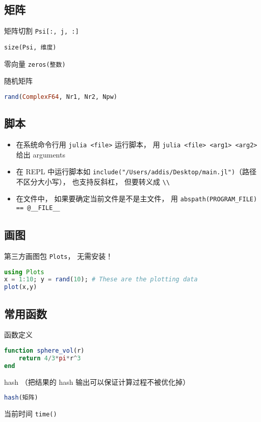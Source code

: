 \subsection{矩阵}
矩阵切割 \verb|Psi[:, j, :]|

\verb|size(Psi, 维度)|

零向量 \verb|zeros(整数)|

随机矩阵
\begin{lstlisting}[language=julia]
rand(ComplexF64, Nr1, Nr2, Npw)
\end{lstlisting}

\subsection{脚本}
\begin{itemize}
\item 在系统命令行用 \verb|julia <file>| 运行脚本， 用 \verb|julia <file> <arg1> <arg2>| 给出 arguments
\item 在 REPL 中运行脚本如 \verb|include("/Users/addis/Desktop/main.jl")|（路径不区分大小写）， 也支持反斜杠， 但要转义成 \verb|\\|
\item 在文件中， 如果要确定当前文件是不是主文件， 用 \verb|abspath(PROGRAM_FILE) == @__FILE__|
\end{itemize}

\subsection{画图}
第三方画图包 \verb|Plots|， 无需安装！
\begin{lstlisting}[language=julia]
using Plots
x = 1:10; y = rand(10); # These are the plotting data
plot(x,y)
\end{lstlisting}

\subsection{常用函数}
函数定义
\begin{lstlisting}[language=julia]
function sphere_vol(r)
    return 4/3*pi*r^3
end
\end{lstlisting}

hash （把结果的 hash 输出可以保证计算过程不被优化掉）
\begin{lstlisting}[language=julia]
hash(矩阵)
\end{lstlisting}

当前时间 \verb|time()|
